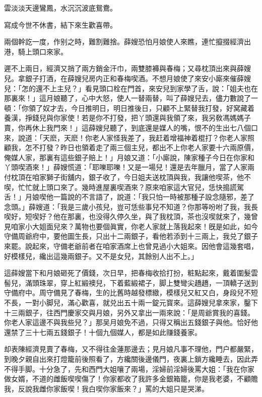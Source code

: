 \begin{myquote}
雲淡淡天邊鸞鳳，水沉沉波底鴛鴦。

寫成今世不休書，結下來生歡喜帶。
\end{myquote}

兩個幹訖一度，作别之時，難割難捨。薛嫂恐怕月娘使人來瞧，連忙攛掇經濟出港，騎上頭口來家。

遲不上兩日，經濟又捎了兩方銷金汗巾，兩雙膝褲與春梅；又尋枕頂出來與薛嫂兒。拿銀子打酒，在薛嫂兒房内正和春梅喫酒。不想月娘使了來安小廝來催薛嫂兒：「怎的還不上主兒？」看見頭口栓在門首，來安兒到家學了舌，說：「姐夫也在那裏來！」這月娘聽了，心中大怒，使人一替兩替，叫了薛嫂兒去，儘力數說了一頓：「你領了奴才去，今日推明日，明日推後日，只顧不上緊替我打發，好窝藏着養漢，掙錢兒與你家使！若是你不打發，把丫頭還與我領了來，我另敎馮媽媽子賣，你再休上我門來！」這薛嫂兒聽了，到底還是媒人的嘴，恨不的生出七八個口來，說道：「天麽，天麽！你老人家怪我差了，我赶着增福神着棍打？你老人家照顧我，怎不打發？昨日也領着走了兩三個主兒，都出不上你老人家要十六兩原價，俺媒人家，那裏有這些銀子賠上！」月娘又道：「小廝說，陳家種子今日在你家和丫頭喫酒來！」薛嫂慌道：「耶嚛耶嚛！又是一場兒！還是去年臘月，當了人家兩付枕頂在咱家獅子街舖内，銀子收了，今日姐夫送枕頂與我，我讓他喫茶，他不喫，忙忙就上頭口來了。幾時進屋裏喫酒來？原來咱家這大官兒，恁快搗謊駕舌！」月娘喫他一篇說的不言語了，說道：「我只怕一時被那種子設念隨邪，差了念頭。」薛嫂道：「我是三歲小孩兒，豈可恁些事兒不知道？你那等吩咐了我，我長喫好，短喫好？他在那裏，也没得久停久坐，與了我枕頂，茶也沒喫就來了，幾曾見咱家小大姐面兒來？萬物也要個眞實，你老人家就上落我起來！旣是如此，如今守備周爺府中，要他圖生長，只出十二兩銀子，看他若添到十三兩上，我兑了銀子來罷。說起來，守備老爺前者在咱家酒席上也曾見過小大姐來。因他會這幾套唱，好模樣兒，纔出這幾兩銀子。又不是女兒，其餘别人出不上。」

這薛嫂當下和月娘砸死了價錢，次日早，把春梅收拾打扮，粧點起來，戴着圍髮雲髻兒，滿頭珠翠，穿上紅緞襖兒，下着藍緞裙子，脚上雙彎尖趫趫，一頂轎子送到守備府中。周守備見了春梅，生的比舊時越發標緻，模樣兒又紅又白，身段兒不短不長，一對小脚兒，滿心歡喜，就兑出五十兩一錠元寳來。這薛嫂兒拿來家，鑿下十三兩銀子，往西門慶家交與月娘，另外又拿出一兩來說：「是周爺賞我的喜錢。你老人家這邊不與我些兒？」那吴月娘免不過，只得又稱出五錢銀子與他。恰好他還禁了三十七兩五錢銀子！十個九個媒人，都是如此赚錢養家。

却表陳經濟見賣了春梅，又不得往金蓮那邊去；見月娘凡事不理他，門户都嚴緊，到晚夕親自出來打燈籠前後照看了，方纔關後邊儀門，夜裏上鎖方纔睡去，因此弄不得手脚。十分急了，先和西門大姐嚷了兩場，淫婦前淫婦後罵大姐：「我在你家做女婿，不道的雌飯喫喫傷了！你家都收了我許多金銀箱籠，你是我老婆，不顧贍我，反說我雌你家飯喫！我白喫你家飯來？」罵的大姐只是哭涕。

